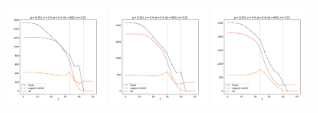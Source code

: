 \documentclass[a4paper]{article}
\begin{document}
\begin{figure}[H]
  \includegraphics[width=0.23\textwidth]{grid-g3-v6-w2_0}
  \includegraphics[width=0.23\textwidth]{grid-g3-v6-w3_0}
  \includegraphics[width=0.23\textwidth]{grid-g3-v6-w4_0}
\end{figure}
\end{document}
